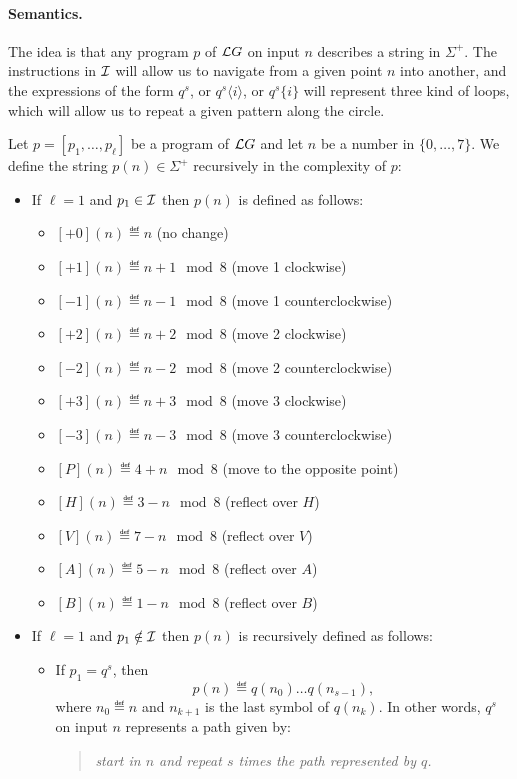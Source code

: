\paragraph{Semantics.}
The idea is that any program $p$ of $\mathcal{L}G$ on input $n$ describes a string in $\Sigma^+$. The instructions in $\mathcal{I}$ will allow us to navigate from a given point $n$ into another, and the expressions of the form $q^s$, or $q^s\langle i\rangle$, or $q^s\{i\}$ will represent three kind of loops, which will allow us to repeat a given pattern along the circle.

Let $p=[p_1,\dots,p_\ell]$ be a program of $\mathcal{L}G$ and let $n$ be a number in $\{0,\dots,7\}$. We define the string $p(n)\in\Sigma^+$ recursively in the complexity of $p$:
\begin{itemize}
\item If $\ell=1$ and $p_1\in\mathcal{I}$ then $p(n)$ is defined as follows:
	\begin{itemize}
	\item $[+0](n)\eqdef  n$ (no change)
	\item $[+1] (n) \eqdef   n+1 \mod 8$ (move 1 clockwise)
	\item $[-1] (n) \eqdef   n-1 \mod 8$ (move 1 counterclockwise)
	\item $[+2] (n) \eqdef   n+2 \mod 8$ (move 2 clockwise)
	\item $[-2] (n) \eqdef   n-2 \mod 8$ (move 2 counterclockwise)
	\item $[+3] (n) \eqdef   n+3 \mod 8$ (move 3 clockwise)
	\item $[-3] (n) \eqdef   n-3 \mod 8$ (move 3 counterclockwise)
	\item $[P](n)\eqdef  4+n \mod 8$ (move to the opposite point)
	\item $[H](n)\eqdef  3-n \mod 8$ (reflect over $H$)
	\item $[V](n)\eqdef  7-n \mod 8$ (reflect over $V$)
	\item $[A](n)\eqdef  5-n \mod 8$ (reflect over $A$)
	\item $[B](n)\eqdef  1-n \mod 8$ (reflect over $B$)
	\end{itemize}

\item If $\ell=1$ and $p_1\notin\mathcal{I}$ then $p(n)$ is recursively defined as follows:

	\begin{itemize}
	\item If $p_1=q^s$, then
	$$
	p(n)\eqdef q(n_0)\dots q(n_{s-1}),
	$$
	where $n_0\eqdef n$ and $n_{k+1}$ is the last symbol of $q(n_k)$. In other words, $q^s$ on input $n$ represents a path given by:
	\begin{quote}\em
	start in $n$ and repeat $s$ times the path represented by $q$.
	\end{quote}
	

\end{itemize}
\end{itemize}
